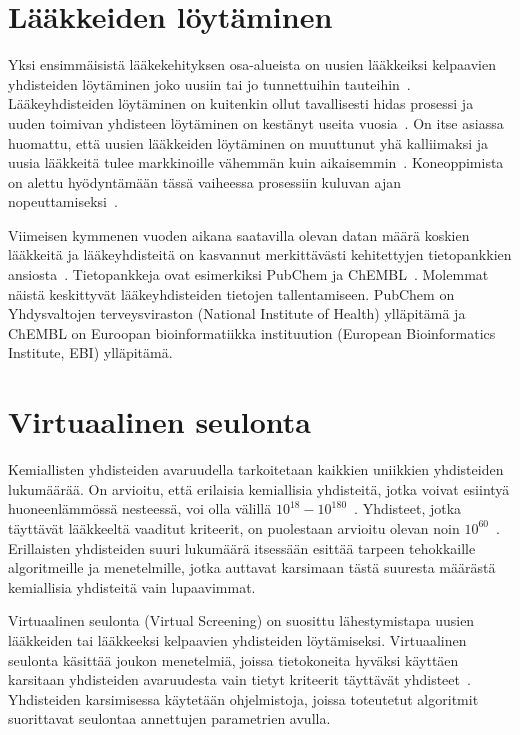 \documentclass[finnish,twoside,censored,tkt,sw-line]{HYthesisML}
\begin{document}
\section{Lääkkeiden löytäminen}

Yksi ensimmäisistä lääkekehityksen osa-alueista on uusien lääkkeiksi kelpaavien yhdisteiden löytäminen joko uusiin tai jo tunnettuihin tauteihin~\cite{EkinsSean2019Emlf}.
Lääkeyhdisteiden löytäminen on kuitenkin ollut tavallisesti hidas prosessi ja uuden toimivan yhdisteen löytäminen on kestänyt useita vuosia~\cite{EkinsSean2019Emlf,MunosBernardH2011Htrb}.
On itse asiassa huomattu, että uusien lääkkeiden löytäminen on muuttunut yhä kalliimaksi ja uusia lääkkeitä tulee markkinoille vähemmän kuin aikaisemmin~\cite{MunosBernardH2011Htrb}.
Koneoppimista on alettu hyödyntämään tässä vaiheessa prosessiin kuluvan ajan nopeuttamiseksi~\cite{VamathevanJessica2019Aoml}.

Viimeisen kymmenen vuoden aikana saatavilla olevan datan määrä koskien lääkkeitä ja lääkeyhdisteitä on kasvannut merkittävästi kehitettyjen tietopankkien ansiosta~\cite{EkinsSean2019Emlf}.
Tietopankkeja ovat esimerkiksi PubChem ja ChEMBL~\cite{NationalCenterForBiotechnologyInformation,chembl}.
Molemmat näistä keskittyvät lääkeyhdisteiden tietojen tallentamiseen.
PubChem on Yhdysvaltojen terveysviraston (National Institute of Health) ylläpitämä ja ChEMBL on Euroopan bioinformatiikka instituution (European Bioinformatics Institute, EBI) ylläpitämä.

\section{Virtuaalinen seulonta}

Kemiallisten yhdisteiden avaruudella tarkoitetaan kaikkien uniikkien yhdisteiden lukumäärää.
On arvioitu, että erilaisia kemiallisia yhdisteitä, jotka voivat esiintyä huoneenlämmössä nesteessä, voi olla välillä \(10^{18} - 10^{180}\)~\cite{SotrifferChristoph2011VSPC}.
Yhdisteet, jotka täyttävät lääkkeeltä vaaditut kriteerit, on puolestaan arvioitu olevan noin \(10^{60}\)~\cite{SotrifferChristoph2011VSPC}.
Erillaisten yhdisteiden suuri lukumäärä itsessään esittää tarpeen tehokkaille algoritmeille ja menetelmille, jotka auttavat karsimaan tästä suuresta määrästä kemiallisia yhdisteitä vain lupaavimmat.

Virtuaalinen seulonta (Virtual Screening) on suosittu lähestymistapa uusien lääkkeiden tai lääkkeeksi kelpaavien yhdisteiden löytämiseksi.
Virtuaalinen seulonta käsittää joukon menetelmiä, joissa tietokoneita hyväksi käyttäen karsitaan yhdisteiden avaruudesta vain tietyt kriteerit täyttävät yhdisteet~\cite{SotrifferChristoph2011VSPC}.
Yhdisteiden karsimisessa käytetään ohjelmistoja, joissa toteutetut algoritmit suorittavat seulontaa annettujen parametrien avulla.
\end{document}
